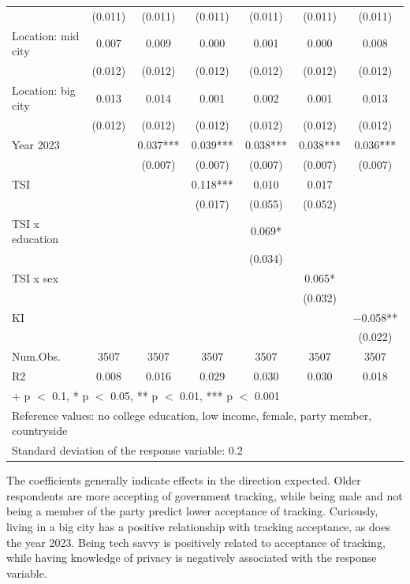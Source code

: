 \documentclass[
  letterpaper,
  DIV=11,
  numbers=noendperiod]{scrartcl}
\begin{document}
\begin{table}
{\begin{tabular}[t]{lcccccc}
 & (\num{0.011}) & (\num{0.011}) & (\num{0.011}) & (\num{0.011}) & (\num{0.011}) & (\num{0.011})\\
Location: mid city & \num{0.007} & \num{0.009} & \num{0.000} & \num{0.001} & \num{0.000} & \num{0.008}\\
 & (\num{0.012}) & (\num{0.012}) & (\num{0.012}) & (\num{0.012}) & (\num{0.012}) & \vphantom{1} (\num{0.012})\\
Location: big city & \num{0.013} & \num{0.014} & \num{0.001} & \num{0.002} & \num{0.001} & \num{0.013}\\
 & (\num{0.012}) & (\num{0.012}) & (\num{0.012}) & (\num{0.012}) & (\num{0.012}) & (\num{0.012})\\
Year 2023 &  & \num{0.037}*** & \num{0.039}*** & \num{0.038}*** & \num{0.038}*** & \num{0.036}***\\
 &  & (\num{0.007}) & (\num{0.007}) & (\num{0.007}) & (\num{0.007}) & (\num{0.007})\\
TSI &  &  & \num{0.118}*** & \num{0.010} & \num{0.017} & \\
 &  &  & (\num{0.017}) & (\num{0.055}) & (\num{0.052}) & \\
TSI x education &  &  &  & \num{0.069}* &  & \\
 &  &  &  & (\num{0.034}) &  & \\
TSI x sex &  &  &  &  & \num{0.065}* & \\
 &  &  &  &  & (\num{0.032}) & \\
KI &  &  &  &  &  & \num{-0.058}**\\
 &  &  &  &  &  & (\num{0.022})\\
\midrule
Num.Obs. & \num{3507} & \num{3507} & \num{3507} & \num{3507} & \num{3507} & \num{3507}\\
R2 & \num{0.008} & \num{0.016} & \num{0.029} & \num{0.030} & \num{0.030} & \num{0.018}\\
\bottomrule
\multicolumn{7}{l}{\rule{0pt}{1em}+ p $<$ 0.1, * p $<$ 0.05, ** p $<$ 0.01, *** p $<$ 0.001}\\
\multicolumn{7}{l}{\rule{0pt}{1em}Reference values: no college education, low income, female, party member, countryside}\\
\multicolumn{7}{l}{\rule{0pt}{1em}Standard deviation of the response variable:  0.2}\\
\end{tabular}

}

\end{table}%

The coefficients generally indicate effects in the direction expected.
Older respondents are more accepting of government tracking, while being
male and not being a member of the party predict lower acceptance of
tracking. Curiously, living in a big city has a positive relationship
with tracking acceptance, as does the year 2023. Being tech savvy is
positively related to acceptance of tracking, while having knowledge of
privacy is negatively associated with the response variable.
\end{document}
